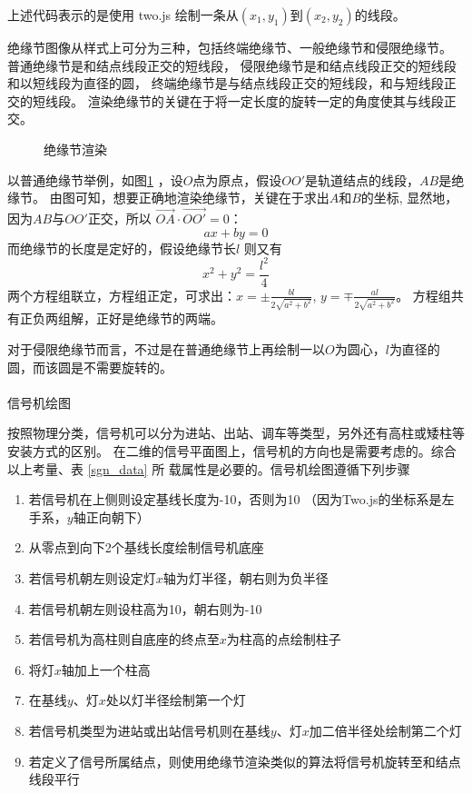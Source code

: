 上述代码表示的是使用 two.js 绘制一条从$(x_1, y_1)$到$(x_2, y_2)$的线段\cite{twojs}。

绝缘节图像从样式上可分为三种，包括终端绝缘节、一般绝缘节和侵限绝缘节。
普通绝缘节是和结点线段正交的短线段，
侵限绝缘节是和结点线段正交的短线段和以短线段为直径的圆，
终端绝缘节是与结点线段正交的短线段，和与短线段正交的短线段。
渲染绝缘节的关键在于将一定长度的旋转一定的角度使其与线段正交。

\begin{figure}[ht]
  \centering
  
  \caption{\label{node}绝缘节渲染}
\end{figure}

以普通绝缘节举例，如图\ref{node} ，设$O$点为原点，假设$OO'$是轨道结点的线段，$AB$是绝缘节。
由图可知，想要正确地渲染绝缘节，关键在于求出$A$和$B$的坐标,
显然地，因为$AB$与$OO'$正交，所以 $\overrightarrow {OA} \cdot \overrightarrow {OO'} = 0$：
$$ax + by = 0$$
而绝缘节的长度是定好的，假设绝缘节长$l$ 则又有
$$x^2 + y^2 = \frac{l^2}{4}$$
两个方程组联立，方程组正定，可求出：$\displaystyle x = \pm \frac{bl}{2\sqrt{a^2+b^2}}$,
$\displaystyle y = \mp \frac{al}{2\sqrt{a^2+b^2}}$。
方程组共有正负两组解，正好是绝缘节的两端。

对于侵限绝缘节而言，不过是在普通绝缘节上再绘制一以$O$为圆心，$l$为直径的圆，而该圆是不需要旋转的。

\paragraph{}信号机绘图

按照物理分类，信号机可以分为进站、出站、调车等类型，另外还有高柱或矮柱等安装方式的区别。
在二维的信号平面图上，信号机的方向也是需要考虑的。综合以上考量、表 \ref{sgn_data} 所
载属性是必要的。信号机绘图遵循下列步骤
\begin{enumerate}
  \item 若信号机在上侧则设定基线长度为-10，否则为10 （因为Two.js的坐标系是左手系，$y$轴正向朝下）
  \item 从零点到向下2个基线长度绘制信号机底座
  \item 若信号机朝左则设定灯$x$轴为灯半径，朝右则为负半径
  \item 若信号机朝左则设柱高为10，朝右则为-10
  \item 若信号机为高柱则自底座的终点至$x$为柱高的点绘制柱子
  \item 将灯$x$轴加上一个柱高
  \item 在基线$y$、灯$x$处以灯半径绘制第一个灯
  \item 若信号机类型为进站或出站信号机则在基线$y$、灯$x$加二倍半径处绘制第二个灯
  \item 若定义了信号所属结点，则使用绝缘节渲染类似的算法将信号机旋转至和结点线段平行
\end{enumerate}

